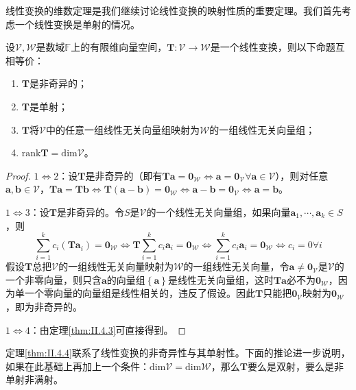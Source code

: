\documentclass[main.tex]{subfiles}
\begin{document}
线性变换的维数定理是我们继续讨论线性变换的映射性质的重要定理。我们首先考虑一个线性变换是单射的情况。

\begin{theorem}\label{thm:II.4.4}
设$\mathcal{V},\mathcal{W}$是数域$\mathbb{F}$上的有限维向量空间，$\mathbf{T}:\mathcal{V}\rightarrow\mathcal{W}$是一个线性变换，则以下命题互相等价：
\begin{enumerate}
    \item $\mathbf{T}$是非奇异的；
    \item $\mathbf{T}$是单射；
    \item $\mathbf{T}$将$\mathcal{V}$中的任意一组线性无关向量组映射为$\mathcal{W}$的一组线性无关向量组；
    \item $\mathrm{rank}\mathbf{T}=\mathrm{dim}\mathcal{V}$。
\end{enumerate}
\end{theorem}
\begin{proof}
$1\Leftrightarrow 2$：设$\mathbf{T}$是非奇异的（即有$\mathbf{Ta}=\mathbf{0}_\mathcal{W}\Leftrightarrow\mathbf{a}=\mathbf{0}_\mathcal{V}\forall\mathbf{a}\in\mathcal{V}$），则对任意$\mathbf{a},\mathbf{b}\in\mathcal{V}$，$\mathbf{Ta}=\mathbf{Tb}\Leftrightarrow\mathbf{T}\left(\mathbf{a}-\mathbf{b}\right)=\mathbf{0}_\mathcal{W}\Leftrightarrow\mathbf{a}-\mathbf{b}=\mathbf{0}_\mathcal{V}\Leftrightarrow\mathbf{a}=\mathbf{b}$。

$1\Leftrightarrow 3$：设$\mathbf{T}$是非奇异的。令$S$是$\mathcal{V}$的一个线性无关向量组，如果向量$\mathbf{a}_1,\cdots,\mathbf{a}_k\in S$，则
\[
\sum_{i=1}^kc_i\left(\mathbf{Ta}_i\right)=\mathbf{0}_\mathcal{W}\Leftrightarrow\mathbf{T}\sum_{i=1}^kc_i\mathbf{a}_i=\mathbf{0}_\mathcal{W}\Leftrightarrow\sum_{i=1}^kc_i\mathbf{a}_i=\mathbf{0}_\mathcal{W}\Leftrightarrow c_i=0\forall i
\]
假设$\mathbf{T}$总把$\mathcal{V}$的一组线性无关向量映射为$\mathcal{W}$的一组线性无关向量，令$\mathbf{a}\neq\mathbf{0}_\mathcal{V}$是$\mathcal{V}$的一个非零向量，则只含$\mathbf{a}$的向量组$\left\{\mathbf{a}\right\}$是线性无关向量组，这时$\mathbf{Ta}$必不为$\mathbf{0}_\mathcal{W}$，因为单一个零向量的向量组是线性相关的，违反了假设。因此$\mathbf{T}$只能把$\mathbf{0}_\mathcal{V}$映射为$\mathbf{0}_\mathcal{W}$，即为非奇异的。

$1\Leftrightarrow 4$：由定理\ref{thm:II.4.3}可直接得到。
\end{proof}

定理\ref{thm:II.4.4}联系了线性变换的非奇异性与其单射性。下面的推论进一步说明，如果在此基础上再加上一个条件：$\mathrm{dim}\mathcal{V}=\mathrm{dim}\mathcal{W}$，那么$\mathbf{T}$要么是双射，要么是非单射非满射。
\end{document}
